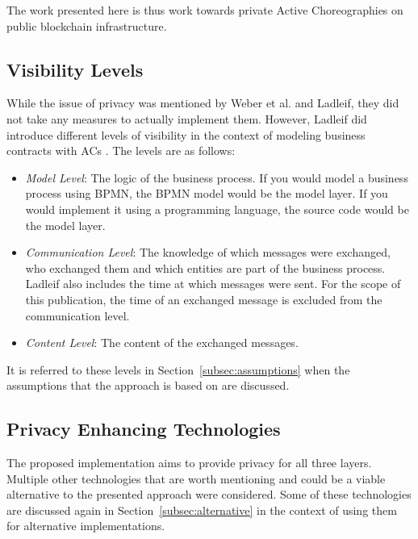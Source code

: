 \documentclass[runningheads]{llncs}
\newcommand{\ber}[1]{\textit{#1}}
\newcommand{\refsec}[1]{Section~\ref{#1}}
\begin{document}
The work presented here is thus work towards private Active Choreographies on public blockchain infrastructure. 




\subsection{Visibility Levels} \label{subsec:levels}

While the issue of privacy was mentioned by Weber et al. and Ladleif, they did not take any measures to actually implement them. However, Ladleif did introduce different levels of visibility in the context of modeling business contracts with ACs \cite{ladleif}. The levels are as follows:



\begin{itemize}
    \item \ber{Model Level}: The logic of the business process. If you would model a business process using BPMN, the BPMN model would be the model layer. If you would implement it using a programming language, the source code would be the model layer.
    \item \ber{Communication Level}: The knowledge of which messages were exchanged, who exchanged them and which entities are part of the business process. Ladleif also includes the time at which messages were sent. For the scope of this publication,
    the time of an exchanged message is excluded from the communication level.
    \item \ber{Content Level}: The content of the exchanged messages.
\end{itemize}

It is referred to these levels in \refsec{subsec:assumptions} when the assumptions that the approach is based on are discussed.




\subsection{Privacy Enhancing Technologies} \label{subsec:technologies}

The proposed implementation aims to provide privacy for all three layers. Multiple other technologies that are worth mentioning and could be a viable alternative to the presented approach were considered. Some of these technologies are discussed again in \refsec{subsec:alternative} in the context of using them for alternative implementations.
\end{document}
